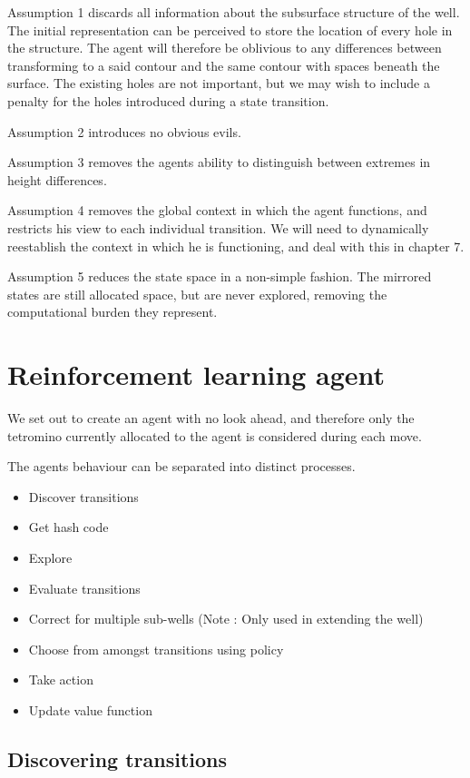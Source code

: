 \documentclass{rucsthesis}
\begin{document}
Assumption 1 discards all information about the subsurface structure of the well. The initial representation can be perceived to store the location of every hole in the structure. The agent will therefore be oblivious to any differences between transforming to a said contour and the same contour with spaces beneath the surface. The existing holes are not important, but we may wish to include a penalty for the holes introduced during a state transition.

Assumption 2 introduces no obvious evils.

Assumption 3 removes the agents ability to distinguish between extremes in height differences.

Assumption 4 removes the global context in which the agent functions, and restricts his view to each individual transition. We will need to dynamically reestablish the context in which he is functioning, and deal with this in chapter 7.

Assumption 5 reduces the state space in a non-simple fashion. The mirrored states are still allocated space, but are never explored, removing the computational burden they represent. 

\section{Reinforcement learning agent}

We set out to create an agent with no look ahead, and therefore only the tetromino currently allocated to the agent is considered during each move.

The agents behaviour can be separated into distinct processes.

\begin{itemize}
\item{Discover transitions}
\item{Get hash code}
\item{Explore}
\item{Evaluate transitions}
\item{Correct for multiple sub-wells (Note : Only used in extending the well) }
\item{Choose from amongst transitions using policy}
\item{Take action}
\item{Update value function}
\end{itemize}

\subsection{Discovering transitions}
\end{document}
